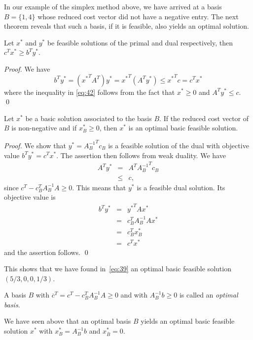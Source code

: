 In our example of the simplex method above, we have arrived at a basis
$B = \{1,4\}$ whose reduced cost vector did not have a negative
entry. The next theorem reveals  that such a basis, if it is
feasible, also yields an optimal solution. 


\begin{theorem}
  \label{thr:15}
  Let $x^*$ and $y^*$ be feasible solutions of the primal and dual
  respectively, then $c^Tx^* \geq b^Ty^*$. 
\end{theorem}

\begin{proof}
  We have 
  \begin{equation}
    \label{eq:42}
    b^T y^* = ({x^*}^TA^T) y^* = {x^*}^T (A^T y^*) \leq {x^*}^T c = c^Tx^*  %
  \end{equation}
 where the inequality in \eqref{eq:42} follows from the fact that
 $x^*\geq0$ and $A^T y^* \leq c$. \qed  
\end{proof}


\begin{lemma}
  \label{lem:14}
  Let $x^*$ be a basic solution associated to the basis $B$. 
  If the reduced cost vector of $B$ is non-negative and if
  $x^*_B\geq0$, then $x^*$ is an optimal basic feasible solution. 
\end{lemma}

\begin{proof}
  We show that $y^* = {A_B^{-1}}^T  c_B$ is a feasible solution of the
  dual with objective value $b^Ty^* = c^Tx^*$. The assertion then
  follows from weak duality. We have 
  \begin{eqnarray*}
    A^T y^* & = & A^T {A_B^{-1}}^T  c_B \\
         & \leq & c,
  \end{eqnarray*}
  since $c^T - c_B^T A_B^{-1}A \geq0$. This means that $y^*$ is a
  feasible dual solution. Its objective value 
  is
  \begin{eqnarray*}
    b^Ty^* & = & {y^*}^T A x^* \\
        & = & c_B^T A_B^{-1} A x^* \\
        & = & c_B^T x^*_B\\
        & = & c^Tx^*
  \end{eqnarray*}
  and the assertion follows. \qed 
\end{proof}

This shows that we have found in~\eqref{eq:39}  an optimal basic
feasible solution $(5/3,0,0,1/3)$.  
\begin{definition}
  \label{def:2}
  A basis $B$ with $\overline{c}^T = c^T - c_B^T A_B^{-1}A \geq0$
  and with $A_B^{-1}b \geq0$ is   called an \emph{optimal basis}. 
\end{definition}
%
We have seen above that an optimal basis $B$ yields an optimal basic
feasible solution $x^*$ with $x^*_B = A_B^{-1}b$ and
$x^*_{\overline{B}} = 0$. 


